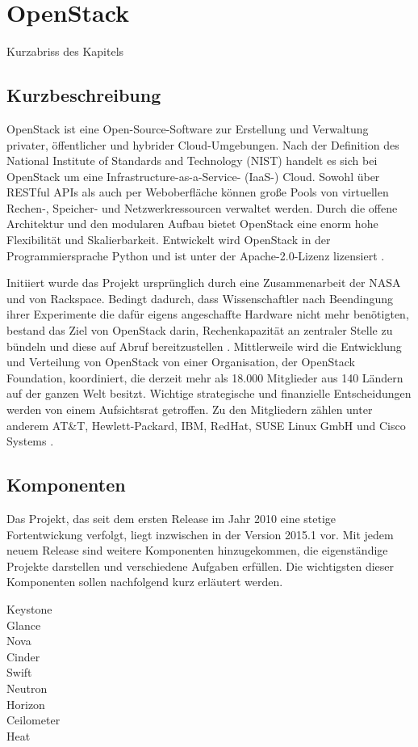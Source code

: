 \chapter{OpenStack}

Kurzabriss des Kapitels

\section{Kurzbeschreibung}OpenStack ist eine Open-Source-Software zur Erstellung und Verwaltung privater, öffentlicher und hybrider Cloud-Umgebungen. Nach der Definition des National Institute of Standards and Technology (NIST) handelt es sich bei OpenStack um eine Infrastructure-as-a-Service- (IaaS-) Cloud. Sowohl über RESTful APIs als auch per Weboberfläche können große Pools von virtuellen Rechen-, Speicher- und Netzwerkressourcen verwaltet werden. Durch die offene Architektur und den modularen Aufbau bietet OpenStack eine enorm hohe Flexibilität und Skalierbarkeit. Entwickelt wird OpenStack in der Programmiersprache Python und ist unter der Apache-2.0-Lizenz lizensiert \cite[vgl.][S. 7ff]{Beitter}. 

Initiiert wurde das Projekt ursprünglich durch eine Zusammenarbeit der NASA und von Rackspace. Bedingt dadurch, dass Wissenschaftler nach Beendingung ihrer Experimente die dafür eigens angeschaffte Hardware nicht mehr benötigten, bestand das Ziel von OpenStack darin, Rechenkapazität an zentraler Stelle zu bündeln und diese auf Abruf bereitzustellen \cite[vgl.][]{Loschwitz}. Mittlerweile wird die Entwicklung und Verteilung von OpenStack von einer Organisation, der OpenStack Foundation, koordiniert, die derzeit mehr als 18.000 Mitglieder aus 140 Ländern auf der ganzen Welt besitzt. Wichtige strategische und finanzielle Entscheidungen werden von einem Aufsichtsrat getroffen. Zu den Mitgliedern zählen unter anderem AT&T, Hewlett-Packard, IBM, RedHat, SUSE Linux GmbH und Cisco Systems \cite[vgl.][]{OpenStackFoundation}.

\section{Komponenten}Das Projekt, das seit dem ersten Release im Jahr 2010 eine stetige Fortentwickung verfolgt, liegt inzwischen in der Version 2015.1 vor. Mit jedem neuem Release sind weitere Komponenten hinzugekommen, die eigenständige Projekte darstellen und verschiedene Aufgaben erfüllen. Die wichtigsten dieser Komponenten sollen nachfolgend kurz erläutert werden.
\begin{description}
\item[Keystone]
\item[Glance]
\item[Nova]
\item[Cinder]
\item[Swift]
\item[Neutron]
\item[Horizon]
\item[Ceilometer]
\item[Heat]
\end{description}
